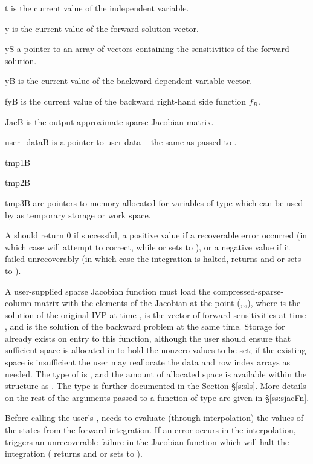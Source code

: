 {
  \begin{args}
  \item[t]
    is the current value of the independent variable.
  \item[y]
    is the current value of the forward solution vector.
  \item[yS]
    a pointer to an array of  vectors containing the sensitivities
    of the forward solution.
  \item[yB]
    is the current value of the backward dependent variable vector.
  \item[fyB]
    is the current value of the backward right-hand side function $f_B$.
  \item[JacB]
    is the output approximate sparse Jacobian matrix. 
  \item[user\_dataB]
    is a pointer to user data -- the same as passed to . 
  \item[tmp1B]
  \item[tmp2B]
  \item[tmp3B]
    are pointers to memory allocated  for variables of type  which 
    can be used by  as temporary storage or work space.    
  \end{args}
}
{
  A  should return 0 if successful, a positive
  value if a recoverable error occurred (in which case {\cvodes} will
  attempt to correct, while {\cvklu} or {\cvsuperlumt} sets
   to ), or a negative value
  if it failed unrecoverably (in which case the integration is halted,
   returns  and {\cvklu} or
  {\cvsuperlumt} sets  to ).
}
{
  A user-supplied sparse Jacobian function must load the
  compressed-sparse-column matrix  with the elements of the
  Jacobian at the point (,,,), where 
  is the solution of the original IVP at time ,  is the
  vector of forward sensitivities at time , and  is the
  solution of the backward problem at the same time.  Storage for
   already exists on entry to this function, although the
  user should ensure that sufficient space is allocated in 
  to hold the nonzero values to be set; if the existing space is
  insufficient the user may reallocate the data and row index arrays
  as needed.  The type of  is , and the amount of
  allocated space is available within the  structure as
  .  The  type is further documented in the Section
  \S\ref{s:sls}.  More details on the rest of the arguments passed to
  a function of type  are given in
  \S\ref{ss:sjacFn}.

  {\warn}Before calling the user's , {\cvodes}
  needs to evaluate (through interpolation) the values of the states
  from the forward integration.  If an error occurs in the
  interpolation, {\cvodes} triggers an unrecoverable failure in the
  Jacobian function which will halt the integration (
  returns  and {\cvklu} or {\cvsuperlumt} sets
   to ).
}

